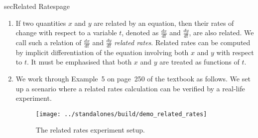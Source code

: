 \documentclass[../main]{subfiles}
\begin{document}
\begin{outline}{sec}{Related Rates}{page} \label{outline:related-rates}
  \begin{enumerate}
    \item If two quantities \(x\) and \(y\) are related by an equation, then their rates of change with respect to a variable \(t\), denoted as \(\frac{dx}{dt}\) and \(\frac{dy}{dt}\), are also related. We call such a relation of \(\frac{dx}{dt}\) and \(\frac{dy}{dt}\) \emph{related rates}. Related rates can be computed by implicit differentiation of the equation involving both \(x\) and \(y\) with respect to \(t\). It must be emphasised that both \(x\) and \(y\) are treated as functions of \(t\).
    \item We work through Example~5 on page~250 of the textbook as follows. We set up a scenario where a related rates calculation can be verified by a real-life experiment. 
      \begin{figure}[ht]
        \centering
        \texttt{[image: ../standalones/build/demo\_related\_rates]}
        \label{fig:related-rates}
        \caption{The related rates experiment setup.}
      \end{figure}


\end{enumerate}
\end{outline}
\end{document}
